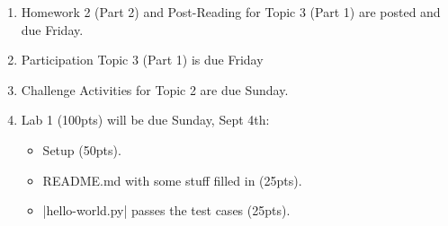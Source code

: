 \documentclass{beamer}
\begin{document}
%
%
%
\begin{frame}
  \begin{enumerate}
    \item Homework 2 (Part 2) and Post-Reading for Topic 3 (Part 1) are posted and due Friday.
    \item Participation Topic 3 (Part 1) is due Friday
    \item Challenge Activities for Topic 2 are due Sunday.
    \item Lab 1 (100pts) will be due Sunday, Sept 4th:
      \begin{itemize}
        \item Setup (50pts).
        \item README.md with some stuff filled in (25pts).
        \item \lstinlne|hello-world.py| passes the test cases (25pts).
      \end{itemize}
  \end{enumerate}
\end{frame}
\end{document}
